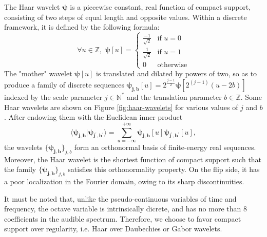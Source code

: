 \documentclass{article}
\makeatletter
\newcommand*{\ie}{i.e.\@\xspace}
\makeatother
\begin{document}
The Haar wavelet $\boldsymbol{\psi}$ is a piecewise constant,
real function of compact support,
consisting of two steps of equal length and opposite values.
Within a discrete framework,
it is defined by the following formula:
\begin{equation}
\forall u \in \mathbb{Z}, \;
\boldsymbol{\psi}[u] = \left\{ \begin{array}{cl}
\frac{-1}{\sqrt{2}} & \mbox{if }u = 0\\
\frac{1}{\sqrt{2}} & \mbox{if }u = 1\\
0 & \mbox{otherwise}
\end{array}\right.
\end{equation}
The "mother" wavelet $\boldsymbol{\psi}[u]$ is translated and dilated by powers of two, so as to
produce a family of discrete sequences
$\boldsymbol{\psi_{j,b}}[u] = 2^{\frac{j-1}{2}} \boldsymbol{\psi}[2^{(j-1)} (u - 2b)]$
indexed by the scale parameter $j \in \mathbb{N^*}$
and the translation parameter $b \in \mathbb{Z}$.
Some Haar wavelets are shown on Figure \ref{fig:haar-wavelets}
for various values of $j$ and $b$.
After endowing them with the Euclidean inner product
\begin{equation}
\langle \boldsymbol{\psi_{j,b}} \vert \boldsymbol{\psi_{j^\prime,b^\prime}} \rangle
 =
 \sum_{u = -\infty}^{+\infty}
 \boldsymbol{\psi_{j, b}}[u]
  \boldsymbol{\psi_{j^\prime,b^\prime}}[u],
\end{equation}
the wavelets $\{\boldsymbol{\psi_{j,b}}\}_{j,b}$ form an orthonormal basis of finite-energy
real sequences.
Moreover, the Haar wavelet is the shortest function of compact support such that the family
$\{\boldsymbol{\psi_{j,b}}\}_{j,b}$ satisfies this orthonormality property.
On the flip side, it has a poor localization in the Fourier domain, owing to its sharp discontinuities.

It must be noted that, unlike the pseudo-continuous variables of time and frequency,
the octave variable is intrinsically dicrete, and has no more than 8 coefficients in
the audible spectrum.
Therefore, we choose to favor compact support over regularity, \ie Haar over
Daubechies or Gabor wavelets.
\end{document}

